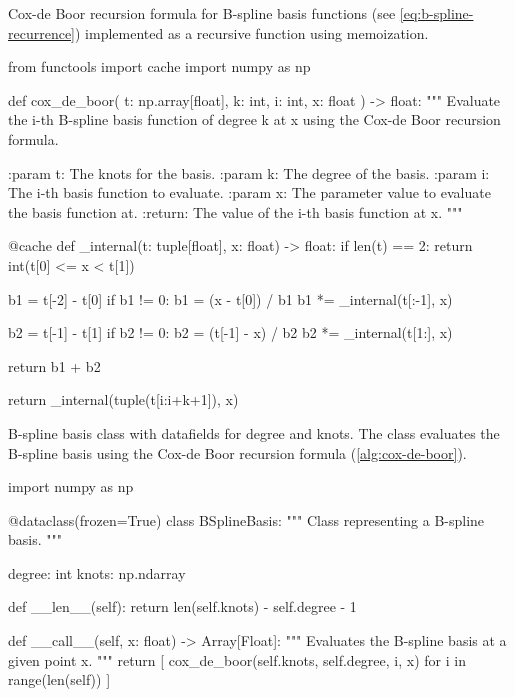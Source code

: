\begin{algorithm}
    \caption{Cox-de Boor recursion formula for B-spline basis functions (see \cref{eq:b-spline-recurrence}) implemented as a recursive function using memoization.}
    \label{alg:cox-de-boor}
    \begin{python}
    from functools import cache
    import numpy as np
    
    def cox_de_boor(
        t: np.array[float], k: int, i: int, x: float
    ) -> float:
        """
        Evaluate the i-th B-spline basis function of degree k at x
        using the Cox-de Boor recursion formula.
    
        :param t: The knots for the basis.
        :param k: The degree of the basis.
        :param i: The i-th basis function to evaluate.
        :param x: The parameter value to evaluate the basis function at.
        :return: The value of the i-th basis function at x.
        """
    
        @cache
        def _internal(t: tuple[float], x: float) -> float:
            if len(t) == 2:
                return int(t[0] <= x < t[1])
    
            b1 = t[-2] - t[0]
            if b1 != 0:
                b1 = (x - t[0]) / b1
                b1 *= _internal(t[:-1], x)
    
            b2 = t[-1] - t[1]
            if b2 != 0:
                b2 = (t[-1] - x) / b2
                b2 *= _internal(t[1:], x)
    
            return b1 + b2
    
        return _internal(tuple(t[i:i+k+1]), x)    
    
    \end{python}
    \end{algorithm}




\begin{algorithm}
\caption{B-spline basis class with datafields for degree and knots. The class evaluates the B-spline basis using the Cox-de Boor recursion formula (\cref{alg:cox-de-boor}).}
\label{alg:b-spline-class}
\begin{python}
import numpy as np

@dataclass(frozen=True)
class BSplineBasis:
    """
    Class representing a B-spline basis.
    """

    degree: int
    knots: np.ndarray

    def __len__(self):
        return len(self.knots) - self.degree - 1

    def __call__(self, x: float) -> Array[Float]:
        """
        Evaluates the B-spline basis at a given point x.
        """
        return [
            cox_de_boor(self.knots, self.degree, i, x)
            for i in range(len(self))
        ]

\end{python}
\end{algorithm}

